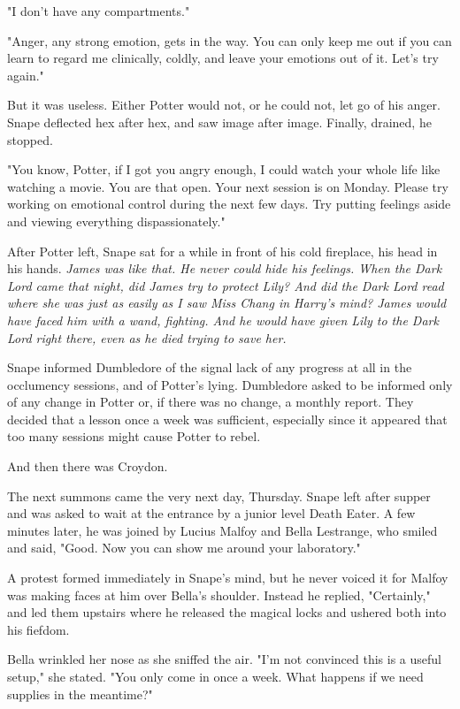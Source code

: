 \documentclass[a4paper,11pt]{article}
\begin{document}
"I don't have any compartments."

"Anger, any strong emotion, gets in the way. You can only keep me out if you can learn to regard me clinically, coldly, and leave your emotions out of it. Let's try again."

But it was useless. Either Potter would not, or he could not, let go of his anger. Snape deflected hex after hex, and saw image after image. Finally, drained, he stopped.

"You know, Potter, if I got you angry enough, I could watch your whole life like watching a movie. You are that open. Your next session is on Monday. Please try working on emotional control during the next few days. Try putting feelings aside and viewing everything dispassionately."

After Potter left, Snape sat for a while in front of his cold fireplace, his head in his hands. \emph{James was like that. He never could hide his feelings. When the Dark Lord came that night, did James try to protect Lily? And did the Dark Lord read where she was just as easily as I saw Miss Chang in Harry's mind? James would have faced him with a wand, fighting. And he would have given Lily to the Dark Lord right there, even as he died trying to save her.}

Snape informed Dumbledore of the signal lack of any progress at all in the occlumency sessions, and of Potter's lying. Dumbledore asked to be informed only of any change in Potter or, if there was no change, a monthly report. They decided that a lesson once a week was sufficient, especially since it appeared that too many sessions might cause Potter to rebel.

And then there was Croydon.

The next summons came the very next day, Thursday. Snape left after supper and was asked to wait at the entrance by a junior level Death Eater. A few minutes later, he was joined by Lucius Malfoy and Bella Lestrange, who smiled and said, "Good. Now you can show me around your laboratory."

A protest formed immediately in Snape's mind, but he never voiced it for Malfoy was making faces at him over Bella's shoulder. Instead he replied, "Certainly," and led them upstairs where he released the magical locks and ushered both into his fiefdom.

Bella wrinkled her nose as she sniffed the air. "I'm not convinced this is a useful setup," she stated. "You only come in once a week. What happens if we need supplies in the meantime?"
\end{document}
